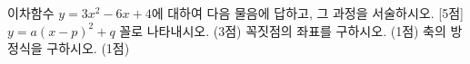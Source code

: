 이차함수 $y=3x^2-6x+4$에 대하여 다음 물음에 답하고, 그 과정을 서술하시오. \mbox{[5점]}
 $y=a(x-p)^2+q$ 꼴로 나타내시오. (3점)
 꼭짓점의 좌표를 구하시오. (1점)
 축의 방정식을 구하시오. (1점)
